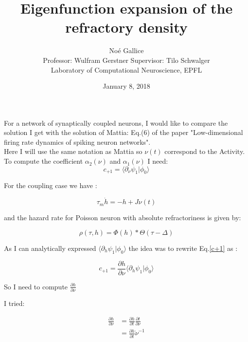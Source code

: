 \documentclass[a4paper,12pt,twoside]{article}
\title{Eigenfunction expansion of the refractory density}
\author{No\'e Gallice \\ Professor: Wulfram Gerstner \hspace{0.5cm}  Supervisor: Tilo Schwalger\\ \small{ Laboratory of Computational Neuroscience, EPFL }
}
\date{January 8, 2018}
\begin{document}
\maketitle

\tableofcontents %

\baselineskip=16pt
\parindent=15pt
\parskip=5pt


%
%
\newpage

For a network of synaptically coupled neurons, I would like to compare  the solution I get with the solution of Mattia: Eq.(6)  of the paper "Low-dimensional firing rate dynamics of  spiking neuron networks". \\

Here I will use the same notation as Mattia so $\nu(t)$ correspond to the Activity.\\

To compute the coefficient $\alpha_2(\nu)$ and $\alpha_1(\nu)$ I need:
\begin{equation}
\label{c+1}
c_{+1}=\langle\partial_{\nu}\psi_1|\phi_0\rangle
\end{equation}

For the coupling case we have :

\begin{equation}
\tau_m\dot{h}=-h+J\nu(t)
\end{equation}

and the hazard rate for Poisson neuron with absolute refractoriness is given by:

\begin{equation}
\rho(\tau,h)=\Phi(h)*\Theta(\tau -\Delta)
\end{equation}

As I can analytically expressed $\langle\partial_{h}\psi_1|\phi_0\rangle$ the idea was to rewrite Eq.\eqref{c+1} as :

\begin{equation}
\label{c+12}
c_{+1}=\frac{\partial h}{\partial \nu}\langle\partial_{h}\psi_1|\phi_0\rangle
\end{equation}

So I need to compute $\frac{\partial h}{\partial \nu}$ 

I tried:

\begin{align}
\frac{\partial h}{\partial \nu}&= \frac{\partial h}{\partial t}\frac{\partial t}{\partial \nu}\\
&=\frac{\partial h}{\partial t}\dot{\nu}^{-1}
\end{align}
\end{document}
